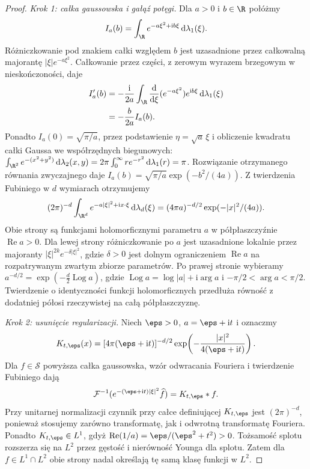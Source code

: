 \begin{proof}
\emph{Krok 1: całka gaussowska i gałąź potęgi.}
Dla $a>0$ i $b\in\R$ połóżmy
\[
 I_a(b)=\int_\R e^{-a\xi^2+\mathrm ib\xi}\,
                  \mathrm d\lambda_1(\xi).
\]
Różniczkowanie pod znakiem całki względem $b$
jest uzasadnione przez całkowalną majorantę
$|\xi|e^{-a\xi^2}$.
Całkowanie przez części, z zerowym wyrazem
brzegowym w nieskończoności, daje
\[
 \begin{split}
 I_a'(b)
 &=-\frac{\mathrm i}{2a}\int_\R
       \frac{\mathrm d}{\mathrm d\xi}(e^{-a\xi^2})
       e^{\mathrm ib\xi}\,\mathrm d\lambda_1(\xi)\\
 &=-\frac{b}{2a}I_a(b).
 \end{split}
\]
Ponadto $I_a(0)=\sqrt{\pi/a}$, przez podstawienie
$\eta=\sqrt a\,\xi$ i obliczenie kwadratu
całki Gaussa we współrzędnych biegunowych:
$\int_{\R^2}e^{-(x^2+y^2)}\,\mathrm d\lambda_2(x,y)
=2\pi\int_0^\infty r e^{-r^2}\,\mathrm d\lambda_1(r)=\pi$.
Rozwiązanie otrzymanego równania zwyczajnego daje
$I_a(b)=\sqrt{\pi/a}\exp(-b^2/(4a))$.
Z twierdzenia Fubiniego w $d$ wymiarach otrzymujemy
\[
 (2\pi)^{-d}\int_{\R^d}
       e^{-a|\xi|^2+\mathrm ix\cdot\xi}\,\mathrm d\lambda_d(\xi)
 =(4\pi a)^{-d/2}\exp(-|x|^2/(4a)).
\]
Obie strony są funkcjami holomorficznymi parametru
$a$ w półpłaszczyźnie $\operatorname{Re}a>0$.
Dla lewej strony różniczkowanie po $a$ jest
uzasadnione lokalnie przez majoranty
$|\xi|^{2k}e^{-\delta|\xi|^2}$, gdzie $\delta>0$
jest dolnym ograniczeniem $\operatorname{Re}a$
na rozpatrywanym zwartym zbiorze parametrów.
Po prawej stronie wybieramy
$a^{-d/2}=\exp(-\tfrac d2\operatorname{Log}a)$,
gdzie $\operatorname{Log}a=\log|a|+\mathrm i\arg a$
i $-\pi/2<\arg a<\pi/2$.
Twierdzenie o identyczności funkcji holomorficznych
przedłuża równość z dodatniej półosi rzeczywistej
na całą półpłaszczyznę.

\emph{Krok 2: usunięcie regularizacji.}
Niech $\eps>0$, $a=\eps+\mathrm it$ i oznaczmy
\[
 K_{t,\eps}(x)=[4\pi(\eps+\mathrm it)]^{-d/2}
 \exp\!\left(-\frac{|x|^2}{4(\eps+\mathrm it)}\right).
\]
Dla $f\in\mathcal S$ powyższa całka gaussowska,
wzór odwracania Fouriera i twierdzenie Fubiniego
dają
\[
 \mathcal F^{-1}(e^{-(\eps+\mathrm it)|\xi|^2}\widehat f)
 =K_{t,\eps}*f .
\]
Przy unitarnej normalizacji czynnik przy całce
definiującej $K_{t,\eps}$ jest $(2\pi)^{-d}$,
ponieważ stosujemy zarówno transformatę, jak
i odwrotną transformatę Fouriera.
Ponadto $K_{t,\eps}\in L^1$, gdyż
$\operatorname{Re}(1/a)=\eps/(\eps^2+t^2)>0$.
Tożsamość splotu rozszerza się na $L^2$
przez gęstość i nierówność Younga dla splotu.
Zatem dla $f\in L^1\cap L^2$ obie strony nadal
określają tę samą klasę funkcji w $L^2$.


\end{proof}
